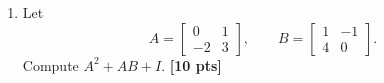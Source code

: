 \documentclass[11pt]{article}
\newif\ifshowsolutions
\newcommand{\R}{\mathbb{R}}
\newcommand{\vect}[1]{\mathbf{#1}}
\newcommand{\pts}[1]{\hfill\textbf{[#1 pts]}}
\newcommand{\workarea}[1]{\ifshowsolutions\else\vspace{#1}\fi}
\newcommand{\solution}[1]{%
  \ifshowsolutions
    \par\medskip
    {\color{solutionblue}\textbf{Solution.} #1}
    \par\medskip
  \fi}
\begin{document}
\begin{enumerate}
\item Let
\[
A=\begin{bmatrix}0&1\\-2&3\end{bmatrix},
\qquad
B=\begin{bmatrix}1&-1\\4&0\end{bmatrix}.
\]
Compute $A^2+AB+I$. \pts{10}
\workarea{2.0in}
\solution{First,
\[
A^2=\begin{bmatrix}-2&3\\-6&7\end{bmatrix},
\qquad
AB=\begin{bmatrix}4&0\\10&2\end{bmatrix}.
\]
Therefore
\[
A^2+AB+I_2
=\begin{bmatrix}-2&3\\-6&7\end{bmatrix}
+\begin{bmatrix}4&0\\10&2\end{bmatrix}
+\begin{bmatrix}1&0\\0&1\end{bmatrix}
=\boxed{\begin{bmatrix}3&3\\4&10\end{bmatrix}}.
\]}
\newpage


\end{enumerate}
\end{document}
